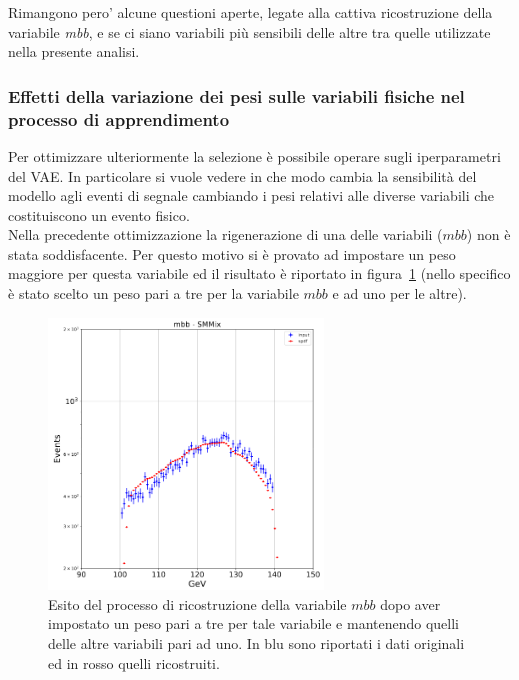 Rimangono pero' alcune questioni aperte, legate alla cattiva ricostruzione della variabile \textit{mbb}, e se ci siano variabili più sensibili delle altre tra quelle utilizzate nella presente analisi.

\newpage

\subsubsection{Effetti della variazione dei pesi sulle variabili fisiche nel processo di apprendimento}
\label{effetti variazione pesi}

Per ottimizzare ulteriormente la selezione è possibile operare sugli iperparametri del VAE. In particolare si vuole vedere in che modo cambia la sensibilità del modello agli eventi di segnale cambiando i pesi relativi alle diverse variabili che costituiscono un evento fisico.\\
Nella precedente ottimizzazione la rigenerazione di una delle variabili ($\textit{mbb}$) non è stata soddisfacente. Per questo motivo si è provato ad impostare un peso maggiore per questa variabile ed il risultato è riportato in figura~\ref{mbb_ottimizzazione} (nello specifico è stato scelto un peso pari a tre per la variabile $\textit{mbb}$ e ad uno per le altre).

\begin{figure}[h!]
	\centering
	\includegraphics[width=0.65\textwidth]{figs/risultati_simulazione/verifica_mbb.png}
	\caption{Esito del processo di ricostruzione della variabile $\textit{mbb}$ dopo aver impostato un peso pari a tre per tale variabile e mantenendo quelli delle altre variabili pari ad uno. In blu sono riportati i dati originali ed in rosso quelli ricostruiti.}
	\label{mbb_ottimizzazione}
\end{figure}

